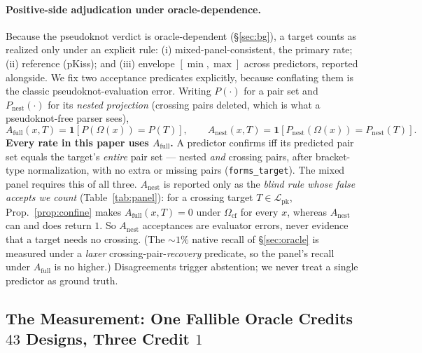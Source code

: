 \documentclass[11pt]{article}
\newcommand{\PK}{\ensuremath{\mathcal{L}_{\mathrm{pk}}}}
\newcommand{\Ocf}{\ensuremath{\Omega_{\mathrm{cf}}}}
\begin{document}
\paragraph{Positive-side adjudication under oracle-dependence.} Because the pseudoknot verdict is
oracle-dependent (\S\ref{sec:bg}), a target counts as realized only under an explicit rule: (i)
mixed-panel-consistent, the primary rate; (ii) reference (pKiss); and (iii) envelope $[\min,\max]$ across
predictors, reported alongside. We fix two acceptance predicates explicitly, because conflating them is the
classic pseudoknot-evaluation error. Writing $P(\cdot)$ for a pair set and $P_{\mathrm{nest}}(\cdot)$ for its
\emph{nested projection} (crossing pairs deleted, which is what a pseudoknot-free parser sees),
\begin{equation}\label{eq:predicates}
  A_{\mathrm{full}}(x,T)=\mathbf 1\!\left[P(\Omega(x))=P(T)\right],
  \qquad
  A_{\mathrm{nest}}(x,T)=\mathbf 1\!\left[P_{\mathrm{nest}}(\Omega(x))=P_{\mathrm{nest}}(T)\right].
\end{equation}
\textbf{Every rate in this paper uses $A_{\mathrm{full}}$.} A predictor confirms iff its predicted pair set
equals the target's \emph{entire} pair set --- nested \emph{and} crossing pairs, after bracket-type
normalization, with no extra or missing pairs (\texttt{forms\_target}). The mixed panel requires this of all
three. $A_{\mathrm{nest}}$ is reported only as the \emph{blind rule whose false accepts we count}
(Table~\ref{tab:panel}): for a crossing target $T\in\PK$, Prop.~\ref{prop:confine} makes
$A_{\mathrm{full}}(x,T)=0$ under \Ocf{} for every $x$, whereas $A_{\mathrm{nest}}$ can and does return $1$. So
$A_{\mathrm{nest}}$ acceptances are evaluator errors, never evidence that a target needs no crossing.
(The $\sim\!1\%$ native recall of \S\ref{sec:oracle} is measured under a \emph{laxer}
crossing-pair-\emph{recovery} predicate, so the panel's recall under $A_{\mathrm{full}}$ is no
higher.) Disagreements trigger abstention; we never treat a single predictor as ground truth.


%



\subsection{The Measurement: One Fallible Oracle Credits $43$ Designs, Three Credit $1$}\label{sec:exp:gaming}
\end{document}
